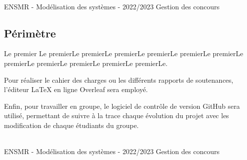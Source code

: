 \noindent\makebox[\linewidth]{\rule{.8\paperwidth}{.6pt}}\\[0.2cm]
ENSMR - Modélisation des systèmes - 2022/2023 \hfill Gestion des concours
\noindent\makebox[\linewidth]{\rule{.8\paperwidth}{.6pt}}
\newpage

\subsection{Périmètre}
\setlength{\parindent}{5ex}
Le premier Le premierLe premierLe premierLe premierLe premierLe premierLe premierLe premierLe premierLe premierLe premierLe.

Pour réaliser le cahier des charges ou les différents rapports de soutenances, l'éditeur \LaTeX{} en ligne Overleaf sera employé.

Enfin, pour travailler en groupe, le logiciel de contrôle de version GitHub sera utilisé, permettant de suivre à la trace chaque évolution du projet avec les modification de chaque étudiants du groupe.

\vfill
\noindent\makebox[\linewidth]{\rule{.8\paperwidth}{.6pt}}\\[0.2cm]
ENSMR - Modélisation des systèmes - 2022/2023 \hfill Gestion des concours
\noindent\makebox[\linewidth]{\rule{.8\paperwidth}{.6pt}}
\newpage